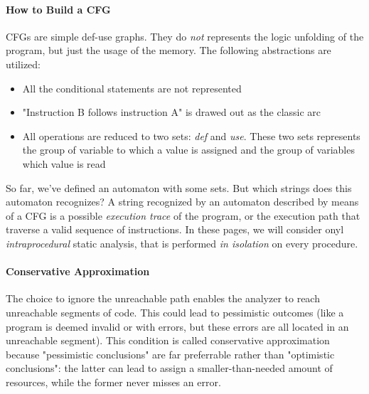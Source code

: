                     \paragraph{How to Build a CFG}
                        CFGs are simple def-use graphs. They do \emph{not} represents the logic unfolding of the program, but just the usage of the memory. The following abstractions are utilized:
                        \begin{itemize}
                            \item All the conditional statements are not represented
                            \item "Instruction B follows instruction A" is drawed out as the classic arc
                            \item All operations are reduced to two sets: \emph{def} and \emph{use}. These two sets represents the group of variable to which a value is assigned and the group of variables which value is read
                        \end{itemize}
                        So far, we've defined an automaton with some sets. But which strings does this automaton recognizes? A string recognized by an automaton described by means of a CFG is a possible \emph{execution trace} of the program, or the execution path that traverse a valid sequence of instructions. In these pages, we will consider onyl \emph{intraprocedural} static analysis, that is performed \emph{in isolation} on every procedure.
                    
                    \paragraph{Conservative Approximation}
                        The choice to ignore the unreachable path enables the analyzer to reach unreachable segments of code. This could lead to pessimistic outcomes (like a program is deemed invalid or with errors, but these errors are all located in an unreachable segment). This condition is called conservative approximation because "pessimistic conclusions" are far preferrable rather than "optimistic conclusions": the latter can lead to assign a smaller-than-needed amount of resources, while the former never misses an error.
                
